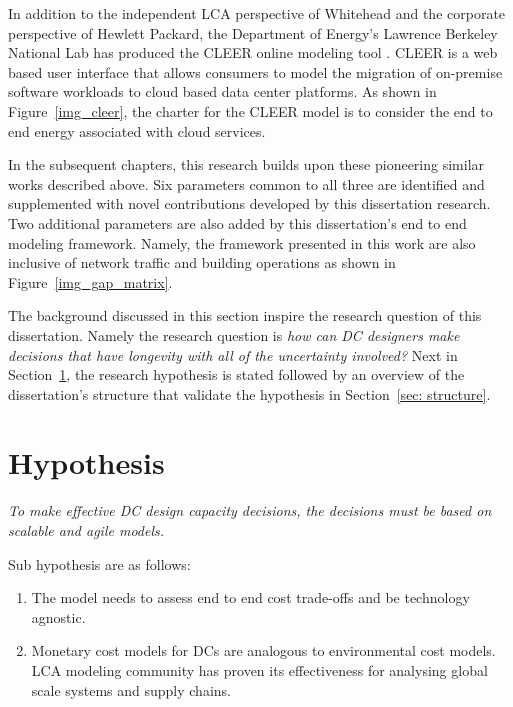     
    
    In addition to the independent LCA perspective of Whitehead and the corporate perspective of Hewlett Packard, the Department of Energy's Lawrence Berkeley National Lab has produced the CLEER online modeling tool \cite{CLEER13}. CLEER is a web based user interface that allows consumers to model the migration of on-premise software workloads to cloud based data center platforms. As shown in Figure~\ref{img_cleer}, the charter for the CLEER model is to consider the end to end energy associated with cloud services.
    
    
    
    In the subsequent chapters, this research builds upon these pioneering similar works described above. Six parameters common to all three are identified and supplemented with novel contributions developed by this dissertation research. Two additional parameters are also added by this dissertation's end to end modeling framework. Namely, the framework presented in this work are also inclusive of network traffic and building operations as shown in Figure~\ref{img_gap_matrix}.
    
    
    
    The background discussed in this section inspire the research question of this dissertation. Namely the research question is \emph{how can DC designers make decisions that have longevity with all of the uncertainty involved?} Next in Section~\ref{sec: hypothesis}, the research hypothesis is stated followed by an overview of the dissertation's structure that validate the hypothesis in Section~\ref{sec: structure}.
    
\section{Hypothesis}
\label{sec: hypothesis}

    \emph{\large To make effective DC design capacity decisions, the decisions must be based on scalable and agile models.}
        
    Sub hypothesis are as follows:
    
    \begin{enumerate}
        \item The model needs to assess end to end cost trade-offs and be technology agnostic.
    
        \item Monetary cost models for DCs are analogous to environmental cost models. LCA modeling community has proven its effectiveness for analysing global scale systems and supply chains.
    \end{enumerate}
    
